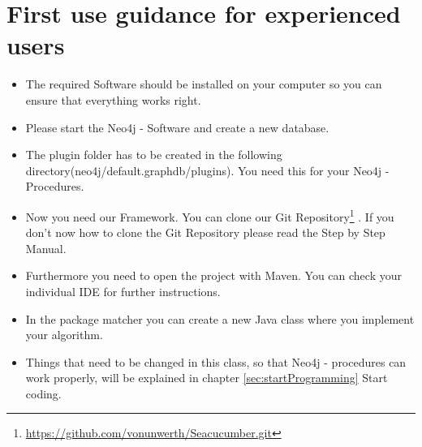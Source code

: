 \newpage

\section {First use guidance for experienced users} \label{sec:beforeFirstUse}
\begin{itemize}
	\item The required Software should be installed on your computer so you can ensure that everything works right.
	\item Please start the Neo4j - Software and create a new database. 
	\item The plugin folder has to be created in the following directory(neo4j/default.graphdb/plugins). You need this for your \glqq  Neo4j - Procedures\grqq{}.
	\item Now you need our Framework. You can clone our \glqq Git Repository\footnote{\url{https://github.com/vonunwerth/Seacucumber.git}} \grqq{}. If you don't now how to clone the \glqq Git Repository\grqq{} please read the Step by Step Manual.
	\item Furthermore you need to open the project with Maven. You can check your individual IDE for further instructions.
	\item In the package \glqq matcher\grqq{} you can create a new Java class where you implement your algorithm.
	\item Things that need to be changed in this class, so that \glqq Neo4j - procedures\grqq{} can work properly, will be explained in chapter \ref{sec:startProgramming} \glqq Start coding\grqq{}. 
\end{itemize}

